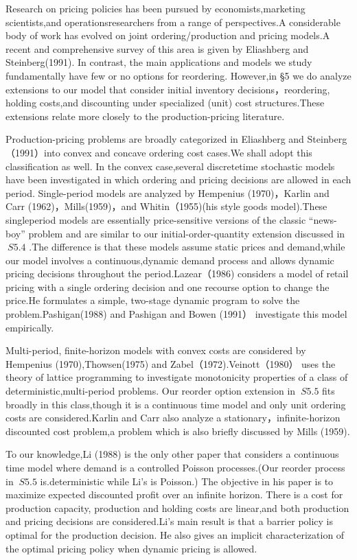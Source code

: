 Research on pricing policies has been pursued by economists,marketing
scientists,and operationsresearchers from a range of perspectives.A
considerable body of work has evolved on joint ordering/production and
pricing models.A recent and comprehensive survey of this area is given
by Eliashberg and Steinberg(1991). In contrast, the main applications
and models we study fundamentally have few or no options for reordering.
However,in §5 we do analyze extensions to our model that consider
initial inventory decisions，reordering, holding costs,and discounting
under specialized (unit) cost structures.These extensions relate more
closely to the production-pricing literature.

Production-pricing problems are broadly categorized in Eliashberg and
Steinberg（1991）into convex and concave ordering cost cases.We shall
adopt this classification as well. In the convex case,several
discretetime stochastic models have been investigated in which ordering
and pricing decisions are allowed in each period. Single-period models
are analyzed by Hempenius (1970)，Karlin and Carr
(1962)，Mills(1959)，and Whitin（1955)(his style goods model).These
singleperiod models are essentially price-sensitive versions of the
classic ``news-boy'' problem and are similar to our
initial-order-quantity extension discussed in \(\ S 5 . 4\) .The
difference is that these models assume static prices and demand,while
our model involves a continuous,dynamic demand process and allows
dynamic pricing decisions throughout the period.Lazear（1986) considers
a model of retail pricing with a single ordering decision and one
recourse option to change the price.He formulates a simple, two-stage
dynamic program to solve the problem.Pashigan(1988) and Pashigan and
Bowen (1991） investigate this model empirically.

Multi-period, finite-horizon models with convex costs are considered by
Hempenius (1970),Thowsen(1975) and Zabel（1972).Veinott（1980） uses the
theory of lattice programming to investigate monotonicity properties of
a class of deterministic,multi-period problems. Our reorder option
extension in \(\ S 5 . 5\) fits broadly in this class,though it is a
continuous time model and only unit ordering costs are considered.Karlin
and Carr also analyze a stationary，infinite-horizon discounted cost
problem,a problem which is also briefly discussed by Mills (1959).

To our knowledge,Li (1988) is the only other paper that considers a
continuous time model where demand is a controlled Poisson
processes.(Our reorder process in \(\ S 5 . 5\) is.deterministic while
Li's is Poisson.) The objective in his paper is to maximize expected
discounted profit over an infinite horizon. There is a cost for
production capacity, production and holding costs are linear,and both
production and pricing decisions are considered.Li's main result is that
a barrier policy is optimal for the production decision. He also gives
an implicit characterization of the optimal pricing policy when dynamic
pricing is allowed.

